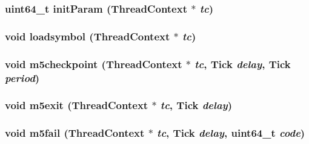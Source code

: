 \label{namespacePseudoInst_a530073934a148e51b0274c3ebaa96f42}
\hypertarget{namespacePseudoInst_a9abf733144bf0f0e7b76fa3d7d18467b}{
\subsubsection[{initParam}]{\setlength{\rightskip}{0pt plus 5cm}uint64\_\-t initParam ({\bf ThreadContext} $\ast$ {\em tc})}}
\label{namespacePseudoInst_a9abf733144bf0f0e7b76fa3d7d18467b}
\hypertarget{namespacePseudoInst_ad8e4a9db66f5b7328670cca9f9549da4}{
\subsubsection[{loadsymbol}]{\setlength{\rightskip}{0pt plus 5cm}void loadsymbol ({\bf ThreadContext} $\ast$ {\em tc})}}
\label{namespacePseudoInst_ad8e4a9db66f5b7328670cca9f9549da4}
\hypertarget{namespacePseudoInst_a276cb03befb21cde7ac21c6302533c01}{
\subsubsection[{m5checkpoint}]{\setlength{\rightskip}{0pt plus 5cm}void m5checkpoint ({\bf ThreadContext} $\ast$ {\em tc}, \/  {\bf Tick} {\em delay}, \/  {\bf Tick} {\em period})}}
\label{namespacePseudoInst_a276cb03befb21cde7ac21c6302533c01}
\hypertarget{namespacePseudoInst_af78146b46bc73f7ec13ab69b3f6e5779}{
\subsubsection[{m5exit}]{\setlength{\rightskip}{0pt plus 5cm}void m5exit ({\bf ThreadContext} $\ast$ {\em tc}, \/  {\bf Tick} {\em delay})}}
\label{namespacePseudoInst_af78146b46bc73f7ec13ab69b3f6e5779}
\hypertarget{namespacePseudoInst_a651838ae3cd047fdc85bd84e3f2215fd}{
\subsubsection[{m5fail}]{\setlength{\rightskip}{0pt plus 5cm}void m5fail ({\bf ThreadContext} $\ast$ {\em tc}, \/  {\bf Tick} {\em delay}, \/  uint64\_\-t {\em code})}}

